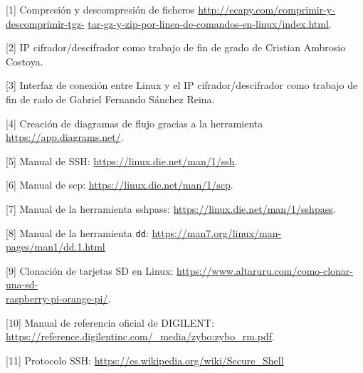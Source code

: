 \hspace{0.5cm}	[\hypertarget{1}{1}] Compresión y descompresión de ficheros \url{http://ecapy.com/comprimir-y-descomprimir-tgz-} \url{tar-gz-y-zip-por-linea-de-comandos-en-linux/index.html}.
	
\hspace{0.5cm}	[\hypertarget{2}{2}] IP cifrador/descifrador como trabajo de fin de grado de Cristian Ambrosio Costoya.
	
\hspace{0.5cm}	[\hypertarget{3}{3}] Interfaz de conexión entre Linux y el IP cifrador/descifrador como trabajo de fin de rado de Gabriel Fernando Sánchez Reina.
	
\hspace{0.5cm}	[\hypertarget{4}{4}] Creación de diagramas de flujo gracias a la herramienta \url{https://app.diagrams.net/}.
	
\hspace{0.5cm}	[\hypertarget{5}{5}] Manual de SSH: \url{https://linux.die.net/man/1/ssh}.
	
\hspace{0.5cm}	[\hypertarget{6}{6}] Manual de scp: \url{https://linux.die.net/man/1/scp}.
	
\hspace{0.5cm}	[\hypertarget{7}{7}] Manual de la herramienta sshpass: \url{https://linux.die.net/man/1/sshpass}.
	
\hspace{0.5cm}	[\hypertarget{8}{8}] Manual de la herramienta \texttt{dd}: \url{https://man7.org/linux/man-pages/man1/dd.1.html}
	
\hspace{0.5cm}	[\hypertarget{9}{9}] Clonación de tarjetas SD en Linux: \url{https://www.altaruru.com/como-clonar-una-sd-}\\
	\url{raspberry-pi-orange-pi/}.
	
\hspace{0.5cm}	[\hypertarget{10}{10}] Manual de referencia oficial de DIGILENT: \url{https://reference.digilentinc.com/_media/zybo:zybo_rm.pdf}.

\hspace{0.5cm}	[\hypertarget{11}{11}] Protocolo SSH: \url{https://es.wikipedia.org/wiki/Secure_Shell}
